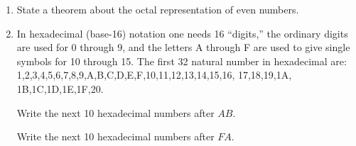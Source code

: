 \documentclass[10pt,]{book}
\theoremstyle{plain}
\theoremstyle{definition}
\theoremstyle{definition}
\numberwithin{equation}{section}
\newcommand{\hint}[1]{ }
\begin{document}
\begin{enumerate}[label=(\alph*)]
          \hint{It is helpful to write something of the form \(n = qd+r\) at each stage. The first two stages should look like
          \begin{equation*}
            3267 \; = \; 466 \cdot 7 + 5
          \end{equation*}
          \begin{equation*}
            466 \; = \; 66 \cdot 7 + 4
          \end{equation*}
          you do the rest\dots{}
          }
\item\hypertarget{li-51}{}
          State a theorem about the octal representation of even numbers.



          \hint{One possibility is to mimic the result for base-10 that an even number always ends in 0,2,4,6 or 8.}
\item\hypertarget{li-52}{}
          In hexadecimal (base-16) notation one needs 16 ``digits,'' the
            ordinary digits are used for 0 through 9, and the letters A through
            F are used to give single symbols for 10 through 15.  The first  32
            natural number in hexadecimal are:
            1,2,3,4,5,6,7,8,9,A,B,C,D,E,F,10,11,12,13,14,15,16, 17,18,19,1A,
            1B,1C,1D,1E,1F,20. 

            Write the next 10 hexadecimal numbers after \(AB\).

            Write the next 10 hexadecimal numbers after \(FA\).


\end{enumerate}
\end{document}
